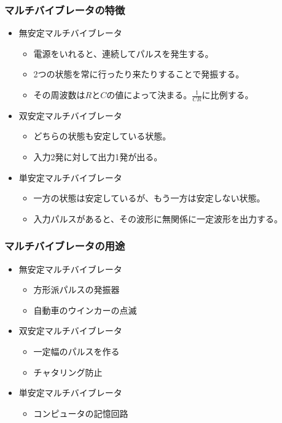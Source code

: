 \documentclass[12pt]{jarticle}
\begin{document}
\subsubsection*{マルチバイブレータの特徴}
\begin{itemize}
    \item 無安定マルチバイブレータ
          \begin{itemize}
              \item 電源をいれると、連続してパルスを発生する。
              \item 2つの状態を常に行ったり来たりすることで発振する。
              \item その周波数は$R$と$C$の値によって決まる。$\frac{1}{CR}$に比例する。
          \end{itemize}
    \item 双安定マルチバイブレータ
          \begin{itemize}
              \item どちらの状態も安定している状態。
              \item 入力2発に対して出力1発が出る。
          \end{itemize}
    \item 単安定マルチバイブレータ
          \begin{itemize}
              \item 一方の状態は安定しているが、もう一方は安定しない状態。
              \item 入力パルスがあると、その波形に無関係に一定波形を出力する。
          \end{itemize}
\end{itemize}
\subsubsection*{マルチバイブレータの用途}
\begin{itemize}
    \item 無安定マルチバイブレータ
          \begin{itemize}
              \item 方形派パルスの発振器
              \item 自動車のウインカーの点滅
          \end{itemize}
    \item 双安定マルチバイブレータ
          \begin{itemize}
              \item 一定幅のパルスを作る
              \item チャタリング防止
          \end{itemize}
    \item 単安定マルチバイブレータ
          \begin{itemize}
              \item コンピュータの記憶回路
          \end{itemize}
\end{itemize}
\end{document}
